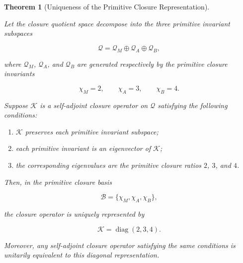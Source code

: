 \documentclass[11pt]{article}
\newtheorem{theorem}{Theorem}[section]
\theoremstyle{definition}
\theoremstyle{remark}
\begin{document}
\begin{theorem}[Uniqueness of the Primitive Closure Representation]
\label{thm:primitive_closure_representation_uniqueness}

Let the closure quotient space decompose into the three primitive
invariant subspaces

\begin{equation}
\mathcal Q
=
\mathcal Q_M
\oplus
\mathcal Q_A
\oplus
\mathcal Q_B,
\end{equation}

where \(\mathcal Q_M\), \(\mathcal Q_A\), and \(\mathcal Q_B\)
are generated respectively by the primitive closure invariants

\begin{equation}
\chi_M=2,
\qquad
\chi_A=3,
\qquad
\chi_B=4.
\end{equation}

Suppose \(\mathcal K\) is a self-adjoint closure operator on
\(\mathcal Q\) satisfying the following conditions:

\begin{enumerate}
\item \(\mathcal K\) preserves each primitive invariant subspace;
\item each primitive invariant is an eigenvector of \(\mathcal K\);
\item the corresponding eigenvalues are the primitive closure
ratios \(2\), \(3\), and \(4\).
\end{enumerate}

Then, in the primitive closure basis

\begin{equation}
\mathcal B
=
\{\chi_M,\chi_A,\chi_B\},
\end{equation}

the closure operator is uniquely represented by

\begin{equation}
\mathcal K
=
\operatorname{diag}(2,3,4).
\end{equation}

Moreover, any self-adjoint closure operator satisfying the same
conditions is unitarily equivalent to this diagonal
representation.

\end{theorem}
\end{document}

